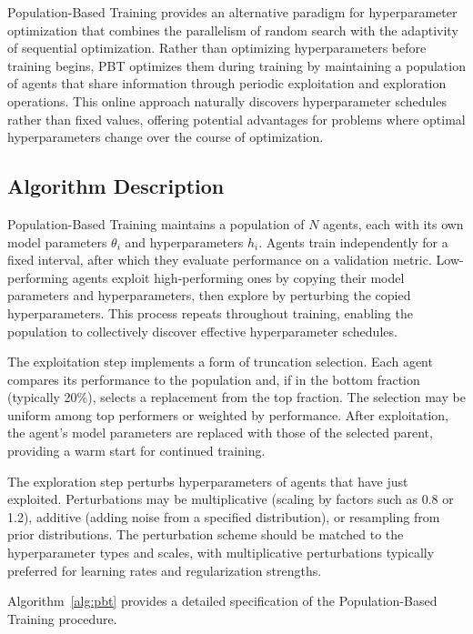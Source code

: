 Population-Based Training provides an alternative paradigm for hyperparameter optimization that combines the parallelism of random search with the adaptivity of sequential optimization. Rather than optimizing hyperparameters before training begins, PBT optimizes them during training by maintaining a population of agents that share information through periodic exploitation and exploration operations. This online approach naturally discovers hyperparameter schedules rather than fixed values, offering potential advantages for problems where optimal hyperparameters change over the course of optimization.

\subsection{Algorithm Description}
\label{subsec:pbt_algorithm}

Population-Based Training maintains a population of $N$ agents, each with its own model parameters $\theta_i$ and hyperparameters $h_i$. Agents train independently for a fixed interval, after which they evaluate performance on a validation metric. Low-performing agents exploit high-performing ones by copying their model parameters and hyperparameters, then explore by perturbing the copied hyperparameters. This process repeats throughout training, enabling the population to collectively discover effective hyperparameter schedules.

The exploitation step implements a form of truncation selection. Each agent compares its performance to the population and, if in the bottom fraction (typically 20\%), selects a replacement from the top fraction. The selection may be uniform among top performers or weighted by performance. After exploitation, the agent's model parameters are replaced with those of the selected parent, providing a warm start for continued training.

The exploration step perturbs hyperparameters of agents that have just exploited. Perturbations may be multiplicative (scaling by factors such as 0.8 or 1.2), additive (adding noise from a specified distribution), or resampling from prior distributions. The perturbation scheme should be matched to the hyperparameter types and scales, with multiplicative perturbations typically preferred for learning rates and regularization strengths.

Algorithm~\ref{alg:pbt} provides a detailed specification of the Population-Based Training procedure.

